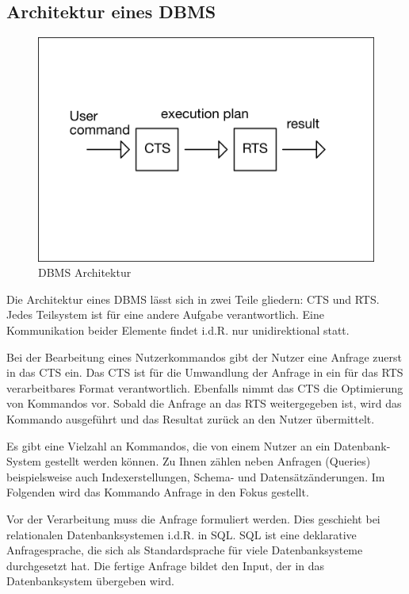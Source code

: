 \subsection{Architektur eines \ac{DBMS}}



\begin{figure}[h]
  \centering
  \includegraphics[width=\textwidth]{02_Grundlagen/DBMS_Architecture.png}
  \caption{\ac{DBMS} Architektur}
  \label{SearchSpace}
\end{figure}

Die Architektur eines \ac{DBMS} lässt sich in zwei Teile gliedern: \ac{CTS} und \ac{RTS}. Jedes Teilsystem ist für eine andere Aufgabe verantwortlich. Eine Kommunikation beider Elemente findet i.d.R. nur unidirektional statt.

Bei der Bearbeitung eines Nutzerkommandos gibt der Nutzer eine Anfrage zuerst in das \ac{CTS} ein. Das \ac{CTS} ist für die Umwandlung der Anfrage in ein für das \ac{RTS} verarbeitbares Format verantwortlich. Ebenfalls nimmt das \ac{CTS} die Optimierung von Kommandos vor. Sobald die Anfrage an das \ac{RTS} weitergegeben ist, wird das Kommando ausgeführt und das Resultat zurück an den Nutzer übermittelt.

Es gibt eine Vielzahl an Kommandos, die von einem Nutzer an ein Datenbank-System gestellt werden können. Zu Ihnen zählen neben Anfragen (Queries) beispielsweise auch Indexerstellungen, Schema-  und Datensätzänderungen. Im Folgenden wird das Kommando Anfrage in den Fokus gestellt.

Vor der Verarbeitung muss die Anfrage formuliert werden. Dies geschieht bei relationalen Datenbanksystemen i.d.R. in \ac{SQL}. \ac{SQL} ist eine deklarative Anfragesprache, die sich als Standardsprache für viele Datenbanksysteme durchgesetzt hat. Die fertige Anfrage bildet den Input, der in das Datenbanksystem übergeben wird. 

